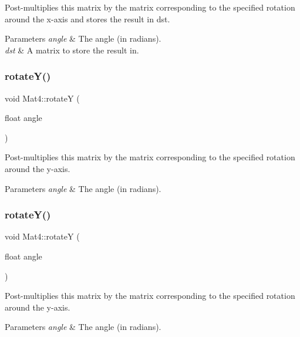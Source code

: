 Post-\/multiplies this matrix by the matrix corresponding to the specified rotation around the x-\/axis and stores the result in dst.


\begin{DoxyParams}{Parameters}
{\em angle} & The angle (in radians). \\
\hline
{\em dst} & A matrix to store the result in. \\
\hline
\end{DoxyParams}
\mbox{\label{classMat4_a5c32002c4bc2d64e6933a8fe50545b51}} 
\subsubsection{\texorpdfstring{rotate\+Y()}{rotateY()}\hspace{0.1cm}{\footnotesize\ttfamily [1/4]}}
{\footnotesize\ttfamily void Mat4\+::rotateY (\begin{DoxyParamCaption}\item[{float}]{angle }\end{DoxyParamCaption})}

Post-\/multiplies this matrix by the matrix corresponding to the specified rotation around the y-\/axis.


\begin{DoxyParams}{Parameters}
{\em angle} & The angle (in radians). \\
\hline
\end{DoxyParams}
\mbox{\label{classMat4_a5c32002c4bc2d64e6933a8fe50545b51}} 
\subsubsection{\texorpdfstring{rotate\+Y()}{rotateY()}\hspace{0.1cm}{\footnotesize\ttfamily [2/4]}}
{\footnotesize\ttfamily void Mat4\+::rotateY (\begin{DoxyParamCaption}\item[{float}]{angle }\end{DoxyParamCaption})}

Post-\/multiplies this matrix by the matrix corresponding to the specified rotation around the y-\/axis.


\begin{DoxyParams}{Parameters}
{\em angle} & The angle (in radians). \\
\hline
\end{DoxyParams}
\mbox{\label{classMat4_a0a36c4dc24d143acfb8f03d8aa1ee164}} 

